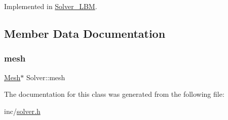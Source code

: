 Implemented in \hyperlink{classSolver__LBM_a59e8d7c94e3895a3586972bdbf0ebb77}{Solver\+\_\+\+L\+BM}.



\subsection{Member Data Documentation}
\mbox{\label{classSolver_a9b516765134fb4193329639761924cf7}} 
\subsubsection{\texorpdfstring{mesh}{mesh}}
{\footnotesize\ttfamily \hyperlink{classMesh}{Mesh}$\ast$ Solver\+::mesh}



The documentation for this class was generated from the following file\+:\begin{DoxyCompactItemize}
\item 
inc/\hyperlink{solver_8h}{solver.\+h}\end{DoxyCompactItemize}
